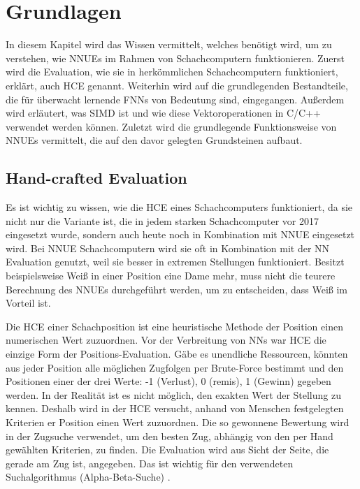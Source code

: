 \chapter{Grundlagen}

In diesem Kapitel wird das Wissen vermittelt, welches benötigt wird, um zu verstehen, wie \acp{NNUE} im Rahmen von Schachcomputern funktionieren. Zuerst wird die Evaluation, wie sie in herkömmlichen Schachcomputern funktioniert, erklärt, auch \ac{HCE} genannt. Weiterhin wird auf die grundlegenden Bestandteile, die für überwacht lernende \acp{FNN} von Bedeutung sind, eingegangen. Außerdem wird erläutert, was \ac{SIMD} ist und wie diese Vektoroperationen in C/C++ verwendet werden können. Zuletzt wird die grundlegende Funktionsweise von \acp{NNUE} vermittelt, die auf den davor gelegten Grundsteinen aufbaut.

\section{Hand-crafted Evaluation}
\label{chap:HCE}

Es ist wichtig zu wissen, wie die \ac{HCE} eines Schachcomputers funktioniert, da sie nicht nur die Variante ist, die in jedem starken Schachcomputer vor 2017 eingesetzt wurde, sondern auch heute noch in Kombination mit \ac{NNUE} eingesetzt wird. Bei \ac{NNUE} Schachcomputern wird sie oft in Kombination mit der \ac{NN} Evaluation genutzt, weil sie besser in extremen Stellungen funktioniert. Besitzt beispielsweise Weiß in einer Position eine Dame mehr, muss nicht die teurere Berechnung des \acp{NNUE} durchgeführt werden, um zu entscheiden, dass Weiß im Vorteil ist.

Die \ac{HCE} einer Schachposition ist eine heuristische Methode der Position einen numerischen Wert zuzuordnen. Vor der Verbreitung von \acp{NN} war \ac{HCE} die einzige Form der Positions-Evaluation. Gäbe es unendliche Ressourcen, könnten aus jeder Position alle möglichen Zugfolgen per Brute-Force bestimmt und den Positionen einer der drei Werte: -1 (Verlust), 0 (remis), 1 (Gewinn) gegeben werden. In der Realität ist es nicht möglich, den exakten Wert der Stellung zu kennen. Deshalb wird in der \ac{HCE} versucht, anhand von Menschen festgelegten Kriterien er Position einen Wert zuzuordnen. Die so gewonnene Bewertung wird in der Zugsuche verwendet, um den besten Zug, abhängig von den per Hand gewählten Kriterien, zu finden. Die Evaluation wird aus Sicht der Seite, die gerade am Zug ist, angegeben. Das ist wichtig für den verwendeten Suchalgorithmus (Alpha-Beta-Suche) \cite{Slagle1969}.

